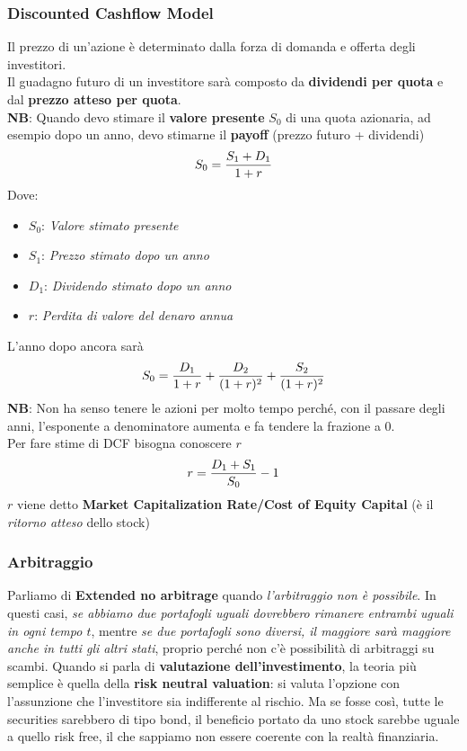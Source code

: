 \documentclass[12pt]{article}
\begin{document}
\subsubsection{Discounted Cashflow Model}
Il prezzo di un'azione è determinato dalla forza di domanda e offerta degli investitori.\\
Il guadagno futuro di un investitore sarà composto da \textbf{dividendi per quota} e dal \textbf{prezzo atteso per quota}.\\[12pt]
\textbf{NB}: Quando devo stimare il \textbf{valore presente} $S_0$ di una quota azionaria, ad esempio dopo un anno, devo stimarne il \textbf{payoff} (prezzo futuro + dividendi)
$$S_0 = {{S_1+D_1}\over{1+r}}$$
Dove:
\begin{itemize}[label=]
    \item $S_0$: \textit{Valore stimato presente}
    \item $S_1$: \textit{Prezzo stimato dopo un anno}
    \item $D_1$: \textit{Dividendo stimato dopo un anno}
    \item $r$: \textit{Perdita di valore del denaro annua}
\end{itemize}
L'anno dopo ancora sarà
$$S_0 = {{D_1}\over{1+r}} + {{D_2}\over{(1+r)^2}} + {{S_2}\over{(1+r)^2}}$$
\textbf{NB}: Non ha senso tenere le azioni per molto tempo perché, con il passare degli anni, l'esponente a denominatore aumenta e fa tendere la frazione a 0.\\[12pt]
Per fare stime di DCF bisogna conoscere $r$
$$r={{D_1 + S_1}\over S_0}- 1$$
$r$ viene detto \textbf{Market Capitalization Rate/Cost of Equity Capital} (è il \textit{ritorno atteso} dello stock)
\subsubsection{Arbitraggio}
Parliamo di \textbf{Extended no arbitrage} quando \textit{l’arbitraggio non è possibile}. In questi casi, \textit{se abbiamo due portafogli uguali dovrebbero rimanere entrambi uguali in ogni tempo $t$}, mentre \textit{se due portafogli sono diversi, il maggiore sarà maggiore anche in tutti gli altri stati}, proprio perché non c'è possibilità di arbitraggi su scambi. Quando si parla di \textbf{valutazione dell'investimento}, la teoria più semplice è quella della \textbf{risk neutral valuation}: si valuta l'opzione con l'assunzione che l'investitore sia indifferente al rischio. Ma se fosse così, tutte le securities sarebbero di tipo bond, il beneficio portato da uno stock sarebbe uguale a quello risk free, il che sappiamo non essere coerente con la realtà finanziaria.
\end{document}
